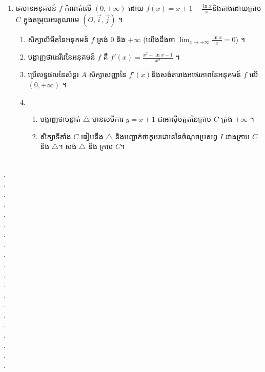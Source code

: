 \documentclass{officialexam}
\begin{document}
\begin{enumerate}[I]
\begin{enumerate}[A]
			\item គេមានអនុគមន៍ $f$ កំណត់លើ $\left(0, +\infty\right)$ ដោយ $f(x)=x+1-\frac{\ln x}{x}$​និងតាងដោយក្រាប $C$ ក្នុងតម្រុយអរតូណរមេ $\left(O, \vec{i}, \vec{j}\right)$ ។
			\begin{enumerate}[1]
				\item សិក្សាលីមីតនៃអនុគមន៍ $f$ ត្រង់ $0$ និង $+\infty$ (យើងដឹងថា $\lim_{x\to+\infty}\frac{\ln x}{x}=0$) ។
				\item បង្ហាញថាដេរីវេនៃអនុគមន៍ $f$ គឺ $f'(x)=\frac{x^2+\ln x-1}{x^2}$ ។
				\item ប្រើលទ្ធផលនៃសំនួរ $A$ សិក្សាសញ្ញានៃ $f'(x)$​និងសង់តារាងអថេរភាពនៃអនុគមន៍ $f$ លើ $\left(0, +\infty\right)$ ។
				\item \begin{enumerate}[k]
					\item បង្ហាញថាបន្ទាត់ $\bigtriangleup$ មានសមីការ $y=x+1$ ជាអាស៊ីមតូតនៃក្រាប $C$ ត្រង់ $+\infty$ ។
					\item សិក្សាទីតាំង $C$ ធៀបនឹង $\bigtriangleup$ និងបញ្ជាក់ថាកូអរដោនេនៃចំណុចប្រសព្វ $I$ រវាងក្រាប $C$ និង $\bigtriangleup$។ សង់ $\bigtriangleup$ និង ក្រាប $C$។
				\end{enumerate} 
			\end{enumerate}
		\end{enumerate}
	\end{enumerate}
\\
{\color{white}.}\dotfill\\
{\color{white}.}\dotfill\\
{\color{white}.}\dotfill
\\
{\color{white}.}\dotfill\\
{\color{white}.}\dotfill\\
{\color{white}.}\dotfill
\\
{\color{white}.}\dotfill\\
{\color{white}.}\dotfill\\
{\color{white}.}\dotfill
\\
{\color{white}.}\dotfill\\
{\color{white}.}\dotfill\\
{\color{white}.}\dotfill
\\
{\color{white}.}\dotfill\\
{\color{white}.}\dotfill\\
{\color{white}.}\dotfill
\\
{\color{white}.}\dotfill\\
{\color{white}.}\dotfill\\
{\color{white}.}\dotfill
\\
{\color{white}.}\dotfill\\
{\color{white}.}\dotfill
\newpage
\maketitle\\
\end{document}
